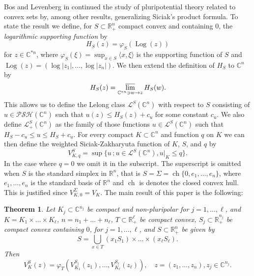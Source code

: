 \documentclass[a4paper,12pt,leqno,english]{article}
\numberwithin{equation}{section}
\newtheorem{theorem+}           {Theorem}      [section]
\newenvironment{theorem}{\begin{theorem+}\sl}{\end{theorem+}\rm}
\begin{document}
Bos and Levenberg in \cite{BosLev:2018} continued the study of pluripotential theory related to convex sets by, among other results,
    generalizing Siciak's product formula.
To state the result we define, for $S \subset \mathbb{R}_+^n$ compact convex and containing $0$, the \emph{logarithmic supporting function} by
\begin{equation*}
    H_S(z)
    =
    \varphi_S(\operatorname{Log}(z))
\end{equation*}
for $z \in \mathbb{C}^{*n}$, where $\varphi_S(\xi) = \sup_{x \in S} \langle x, \xi \rangle$ is the supporting function of $S$
    and $\operatorname{Log}(z) = (\log|z_1|, \dots, \log|z_n|)$.
We then extend the definition of $H_S$ to $\mathbb{C}^n$ by
\begin{equation*}
    H_S(z)
    =
    \varlimsup_{\mathbb{C}^{*n} \ni w \rightarrow z} H_S(w).
\end{equation*}
This allows us to define the Lelong class $\mathcal{L}^S(\mathbb{C}^n)$ with respect to $S$ consisting of $u \in \mathcal{PSH}(\mathbb{C}^n)$
    such that $u(z) \leq H_S(z) + c_u$ for some constant $c_u$.
We also define $\mathcal{L}^S_+(\mathbb{C}^n)$ as the family of those functions $u \in \mathcal{L}^S(\mathbb{C}^n)$
    such that $H_S - c_u \leq u \leq H_S + c_u$.
For every compact $K \subset \mathbb{C}^n$ and function $q$ on $K$ we can then define the weighted Siciak-Zakharyuta function of $K$, $S$, and $q$ by
\begin{equation*}
    V^S_{K, q}
    =
    \sup\{u \,; u \in \mathcal{L}^S(\mathbb{C}^n), u|_K \leq q\}.
\end{equation*}
In the case where $q = 0$ we omit it in the subscript.
The superscript is omitted when $S$ is the standard simplex in $\mathbb{R}^n$,
    that is $S = \Sigma = \operatorname{ch}\{0, e_1, \dots, e_n\}$,
    where $e_1, \dots, e_n$ is the standard basis of $\mathbb{R}^n$ and $\operatorname{ch}$ is denotes the closed convex hull.
This is justified since $V^\Sigma_{K, 0} = V_K$.
The main result of this paper is the following:
\begin{theorem}
\label{mainresult}
Let 
    $K_j \subset \mathbb{C}^{n_j}$ be compact and non-pluripolar for $j = 1, \dots, \ell$, and
    $K = K_1 \times \dots \times K_\ell$,
    $n = n_1 + \dots + n_\ell$,
    $T \subset \mathbb{R}_+^\ell$ be compact convex,
    $S_j \subset \mathbb{R}_+^{n_j}$ be compact convex containing $0$, for $j = 1, \dots, \ell$, and
    $S \subset \mathbb{R}_+^n$ be given by
\begin{equation*}
    S
    =
    \bigcup_{x \in T} (x_1 S_1) \times \dots \times (x_\ell S_\ell).
\end{equation*}
Then
\begin{equation*}
    V^S_K(z)
    =
    \varphi_T(V^{S_1}_{K_1}(z_1), \dots, V^{S_\ell}_{K_\ell}(z_\ell)),
    \quad
    z = (z_1, \dots, z_n), z_j \in \mathbb{C}^{n_j}.
\end{equation*}
\end{theorem}
\end{document}

